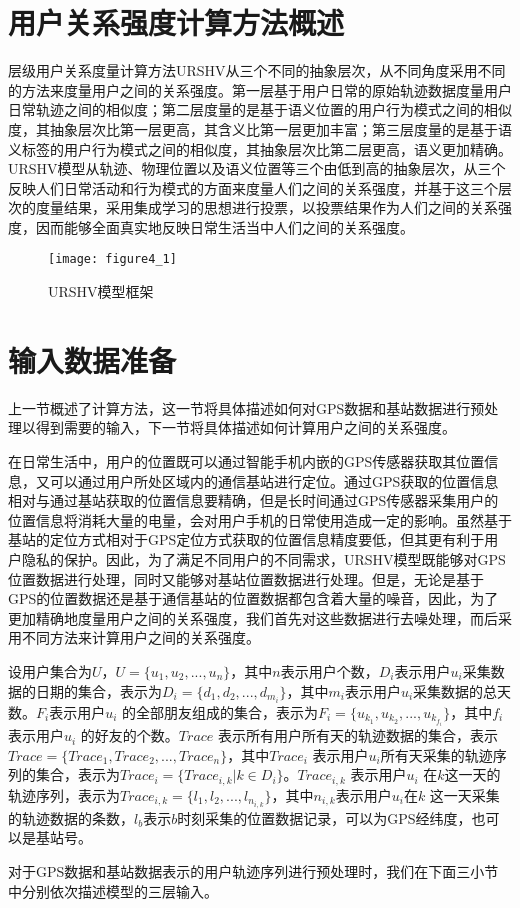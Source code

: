 \section{用户关系强度计算方法概述}
\label{sec:section4-1}
层级用户关系度量计算方法URSHV从三个不同的抽象层次，从不同角度采用不同的方法来度量用户之间的关系强度。第一层基于用户日常的原始轨迹数据度量用户日常轨迹之间的相似度；第二层度量的是基于语义位置的用户行为模式之间的相似度，其抽象层次比第一层更高，其含义比第一层更加丰富；第三层度量的是基于语义标签的用户行为模式之间的相似度，其抽象层次比第二层更高，语义更加精确。URSHV模型从轨迹、物理位置以及语义位置等三个由低到高的抽象层次，从三个反映人们日常活动和行为模式的方面来度量人们之间的关系强度，并基于这三个层次的度量结果，采用集成学习的思想进行投票，以投票结果作为人们之间的关系强度，因而能够全面真实地反映日常生活当中人们之间的关系强度。
\begin{figure}[htp]
\centering
\texttt{[image: figure4\_1]}
\caption{URSHV模型框架}
\label{fig:4_1}
\end{figure}

\section{输入数据准备}
\label{sec:section4-2}
上一节概述了计算方法，这一节将具体描述如何对GPS数据和基站数据进行预处理以得到需要的输入，下一节将具体描述如何计算用户之间的关系强度。
\par 在日常生活中，用户的位置既可以通过智能手机内嵌的GPS传感器获取其位置信息，又可以通过用户所处区域内的通信基站进行定位。通过GPS获取的位置信息相对与通过基站获取的位置信息要精确，但是长时间通过GPS传感器采集用户的位置信息将消耗大量的电量，会对用户手机的日常使用造成一定的影响。虽然基于基站的定位方式相对于GPS定位方式获取的位置信息精度要低，但其更有利于用户隐私的保护。因此，为了满足不同用户的不同需求，URSHV模型既能够对GPS位置数据进行处理，同时又能够对基站位置数据进行处理。但是，无论是基于GPS的位置数据还是基于通信基站的位置数据都包含着大量的噪音，因此，为了更加精确地度量用户之间的关系强度，我们首先对这些数据进行去噪处理，而后采用不同方法来计算用户之间的关系强度。
\par 设用户集合为$U$，$U=\{u_{1},u_{2},...,u_{n}\}$，其中$n$表示用户个数，$D_{i}$表示用户$u_{i}$采集数据的日期的集合，表示为$D_{i}=\{d_{1},d_{2},...,d_{m_{i}}\}$，其中$m_{i}$表示用户$u_{i}$采集数据的总天数。$F_{i}$表示用户$u_{i}$ 的全部朋友组成的集合，表示为$F_{i}=\{u_{k_{1}},u_{k_{2}},...,u_{k_{f_{i}}}\}$，其中$f_{i}$表示用户$u_{i}$ 的好友的个数。$Trace$ 表示所有用户所有天的轨迹数据的集合，表示$Trace=\{Trace_{1},Trace_{2},...,Trace_{n}\}$，其中$Trace_{i}$ 表示用户$u_{i}$所有天采集的轨迹序列的集合，表示为$Trace_{i}=\{Trace_{i,k}|k\in D_{i}\}$。$Trace_{i,k}$ 表示用户$u_{i}$ 在$k$这一天的轨迹序列，表示为$Trace_{i,k}=\{l_{1},l_{2},...,l_{n_{i,k}}\}$，其中$n_{i,k}$表示用户$u_i$在$k$ 这一天采集的轨迹数据的条数，$l_b$表示$b$时刻采集的位置数据记录，可以为GPS经纬度，也可以是基站号。
\par 对于GPS数据和基站数据表示的用户轨迹序列进行预处理时，我们在下面三小节中分别依次描述模型的三层输入。
